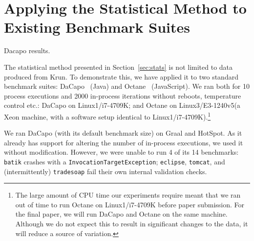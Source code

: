 \documentclass[preprint,numbers,10pt]{sigplanconf}
\newcommand{\bencherthree}{Linux1/i7-4709K\xspace}
\newcommand{\bencherseven}{Linux3/E3-1240v5\xspace}
\begin{document}
\section{Applying the Statistical Method to Existing Benchmark Suites}
\label{sec:existing}

\begin{table}[t]
\centering

\caption{Dacapo results.}
\label{tab:dacapo}
\end{table}

The statistical method presented in Section~\ref{sec:stats} is not limited to data
produced from Krun. To demonstrate this, we have applied it to two standard
benchmark suites: DaCapo~\cite{dacapo06} (Java) and Octane~\cite{octane}
(JavaScript). We ran both for 10 process executions and 2000 in-process
iterations without reboots, temperature control etc.: DaCapo on \bencherthree;
and Octane on \bencherseven (a Xeon machine, with a software setup
identical to \bencherthree).\footnote{The large amount of CPU time our
experiments require meant that we ran out of time to run Octane on \bencherthree
before paper submission. For the final paper, we will run DaCapo and Octane on
the same machine. Although we do not expect this to result in significant
changes to the data, it will reduce a source of variation.}

We ran DaCapo (with its default benchmark size) on Graal and HotSpot. As it already has support for
altering the number of in-process executions, we used it without modification.
However, we were unable to run 4 of its 14 benchmarks: \texttt{batik}
crashes with a \texttt{Invocation\-Target\-Exception}; \texttt{eclipse},
\texttt{tomcat}, and (intermittently) \texttt{tradesoap} fail their own internal
validation checks.
\end{document}

